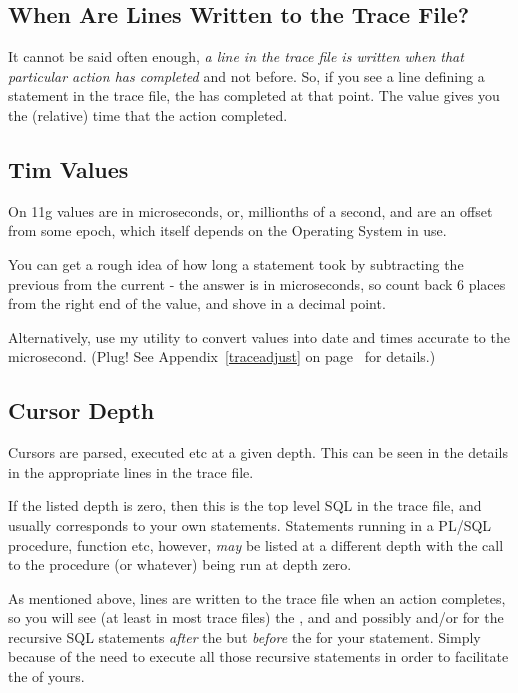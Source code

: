 \subsection{When Are Lines Written to the Trace File?}

It cannot be said often enough, \emph{a line in the trace file is written when that particular action has completed} and not before. So, if you see a line defining a  statement in the trace file, the  has completed at that point. The  value gives you the (relative) time that the action completed. 

\subsection{Tim Values}

On 11g  values are in microseconds, or, millionths of a second, and are an offset from some epoch, which itself depends on the Operating System in use.

You can get a rough idea of how long a statement took by subtracting the previous  from the current  - the answer is in microseconds, so count back 6 places from the right end of the  value, and shove in a decimal point.

Alternatively, use my  utility to convert  values into date and times accurate to the microsecond. (Plug! See Appendix~\ref{traceadjust} on page~\pageref{traceadjust} for details.)

\subsection{Cursor Depth}

Cursors are parsed, executed etc at a given depth. This can be seen in the  details in the appropriate lines in the trace file.

If the listed depth is zero, then this is the top level SQL in the trace file, and usually corresponds to your own statements. Statements running in a PL/SQL procedure, function etc, however, \emph{may} be listed at a different depth with the call to the procedure (or whatever) being run at depth zero.

As mentioned above, lines are written to the trace file when an action completes, so you will see (at least in most trace files) the ,  and  and possibly  and/or  for the recursive SQL statements \emph{after} the  but \emph{before} the  for your statement. Simply because of the need to execute all those recursive statements in order to facilitate the  of yours.

